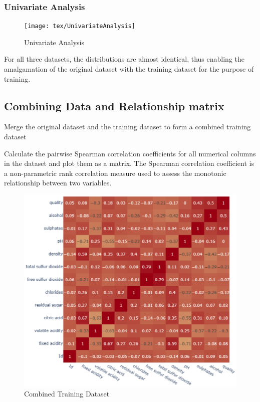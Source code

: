 \subsubsection{Univariate Analysis}\phantom{...}

\begin{figure}[H]
	\centering
	\texttt{[image: tex/UnivariateAnalysis]}
	\caption{Univariate Analysis}
	\label{fig:univariateanalysis}
\end{figure}

For all three datasets, the distributions are almost identical, thus enabling the amalgamation of the original dataset with the training dataset for the purpose of training.

\subsection{Combining Data and Relationship matrix}\phantom{...}

Merge the original dataset and the training dataset to form a combined training dataset

Calculate the pairwise Spearman correlation coefficients for all numerical columns in the dataset and plot them as a matrix. The Spearman correlation coefficient is a non-parametric rank correlation measure used to assess the monotonic relationship between two variables.

\begin{figure}[H]
	\centering
	\includegraphics[width=0.7\linewidth]{tex/CombinedTrainingDataset}
	\caption{Combined Training Dataset}
	\label{fig:combinedtrainingdataset}
\end{figure}

